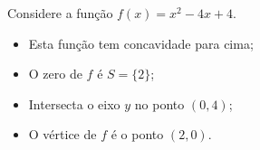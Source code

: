   \begin{exem}
 Considere a função $f(x)= x^2-4x+4$.

\begin{itemize}
    \item Esta função tem concavidade para cima;
    \item O zero de $f$ é $S= \{2\}$;
    \item Intersecta o eixo $y$ no ponto $(0,4)$;
    \item O vértice de $f$ é o ponto $(2, 0)$.
\end{itemize}

\begin{center}
\end{center}
 \end{exem}
 
